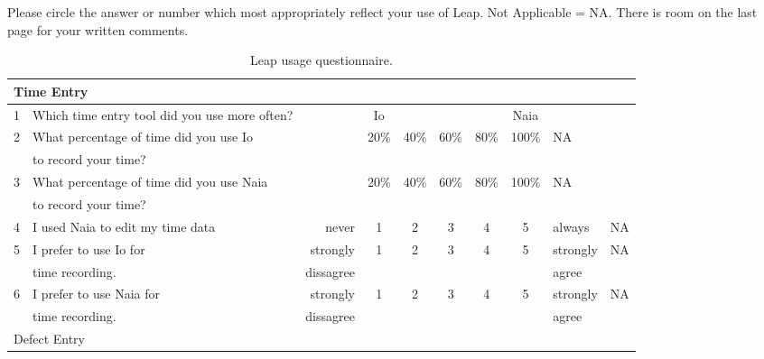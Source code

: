 
\label{sec:questionaire-leap}
Please circle the answer or number which most appropriately reflect your
use of Leap.  Not Applicable = NA.   There is room on the last page for your
written comments.
\begin{table}[htbp]
  \caption{Leap usage questionnaire.}  
  \begin{tabular}{rlrccccclc}\\
    \hline
    \multicolumn{10}{l}{Time Entry}\\ \hline
    1&Which time entry tool did you use more often?&&Io&&&&Naia\\ \hline
    2&What percentage of time did you use Io&&20\%&40\%&60\%&80\%&100\%&NA\\
    &to record your time?\\ \hline
    3&What percentage of time did you use Naia&&20\%&40\%&60\%&80\%&100\%&NA\\
    &to record your time?\\ \hline
    4&I used Naia to edit my time data&never&1&2&3&4&5&always&NA\\ \hline
    5&I prefer to use Io for &strongly&1&2&3&4&5&strongly&NA\\
    &time recording.&dissagree&&&&&&agree \\ \hline
    6&I prefer to use Naia for &strongly&1&2&3&4&5&strongly&NA\\
    &time recording.&dissagree&&&&&&agree \\ \hline
    \hline
    \multicolumn{10}{l}{Defect Entry}\\ \hline

  \end{tabular}
\end{table}


